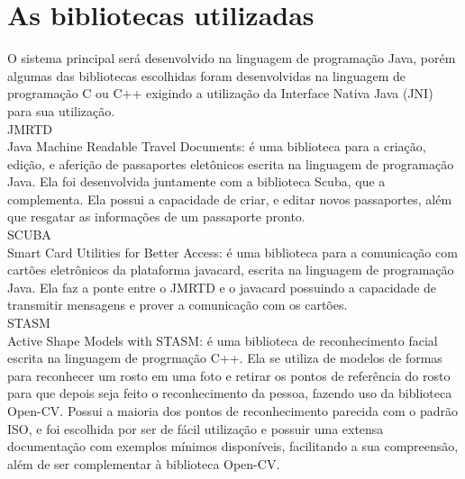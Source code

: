 \documentclass{article}
\begin{document}
	\section{As bibliotecas utilizadas}
		\begin{flushleft}
			 
			\hspace{2cm}O sistema principal será desenvolvido na linguagem de programação Java, porém algumas das bibliotecas escolhidas foram desenvolvidas na linguagem de programação C ou C++ exigindo a utilização da Interface Nativa Java (JNI) para sua utilização.\\
		\vspace{10px}
        \hspace{2cm}JMRTD\cite{JMRTD}\\
    \hspace{2cm}Java Machine Readable Travel Documents: é uma biblioteca para a criação, edição, e aferição de passaportes eletônicos escrita na linguagem de programação Java. Ela foi desenvolvida juntamente com a biblioteca Scuba, que a complementa. Ela possui a capacidade de criar, e editar novos passaportes, além que resgatar as informações de um passaporte pronto. \\
        \vspace{10px}
		\hspace{2cm}SCUBA\cite{SCUBA}\\
    \hspace{2cm}Smart Card Utilities for Better Access: é uma biblioteca para a comunicação com cartões eletrônicos da plataforma javacard, escrita na linguagem de programação Java. Ela faz a ponte entre o JMRTD e o javacard possuindo a capacidade de transmitir mensagens e prover a comunicação com os cartões.\\
		\vspace{10px}
        \hspace{2cm}STASM\cite{STASM}\\
    \hspace{2cm}Active Shape Models with STASM: é uma biblioteca de reconhecimento facial escrita na linguagem de progrmação C++. Ela se utiliza de modelos de formas para reconhecer um rosto em uma foto e retirar os pontos de referência do rosto para que depois seja feito o reconhecimento da pessoa, fazendo uso da biblioteca Open-CV. Possui a maioria dos pontos de reconhecimento parecida com o padrão ISO\cite{ISO}, e foi escolhida por ser de fácil utilização e possuir uma extensa documentação com exemplos mínimos disponíveis, facilitando a sua compreensão, além de ser complementar à biblioteca Open-CV.\\

\end{flushleft}
\end{document}
